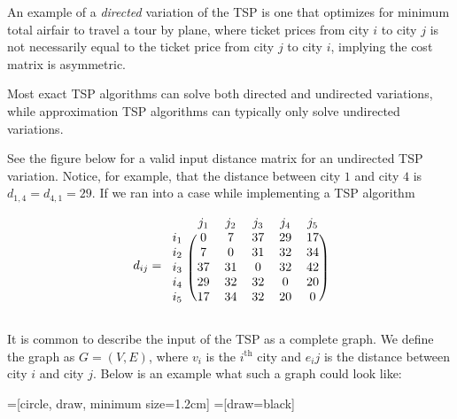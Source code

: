\documentclass[11pt,fleqn]{article}
\begin{document}
An example of a \textit{directed} variation of the TSP is one that
optimizes for minimum total airfair to travel a tour by plane,
where ticket prices from city $i$ to city $j$ is not necessarily
equal to the ticket price from city $j$ to city $i$, implying the
cost matrix is asymmetric.
\par

Most exact TSP algorithms can solve both directed and undirected variations,
while approximation TSP algorithms can typically only solve undirected
variations.
\par

See the figure below for a valid input distance matrix for an undirected
TSP variation.  Notice, for example, that the distance between city $1$
and city $4$ is $d_{1,4}=d_{4,1}=29$.  If we ran into a case while
implementing a TSP algorithm
\par

\begin{align*}
  d_{ij}=
  \begin{blockarray}{cccccc}
    & j_1 & j_2 & j_3 & j_4 & j_5 \\
  \begin{block}{c(ccccc)}
    i_1 & 0 & 7 & 37 & 29 & 17 \\
    i_2 & 7 & 0 & 31 & 32 & 34 \\
    i_3 & 37 & 31 & 0 & 32 & 42 \\
    i_4 & 29 & 32 & 32 & 0 & 20 \\
    i_5 & 17 & 34 & 32 & 20 & 0 \\
  \end{block}
  \end{blockarray}
\end{align*}

It is common to describe the input of the TSP as a complete graph.
We define the graph as $G=(V,E)$, where $v_i$ is the $i^{\text{th}}$
city and $e_ij$ is the distance between city $i$ and city $j$.  Below
is an example what such a graph could look like:

=[circle, draw, minimum size=1.2cm]
=[draw=black]
\end{document}
